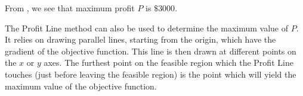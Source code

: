 \begin{subquestions}
From , we see that maximum profit $P$ is $ \$ 3000$.


\subquestion

The Profit Line method can also be used to determine the maximum value of $P$. It relies on drawing parallel lines, starting from the origin, which have the gradient of the objective function. This line is then drawn at different points on the $x$ or $y$ axes. The furthest point on the feasible region which the Profit Line touches (just before leaving the feasible region) is the point which will yield the maximum value of the objective function. 

\end{subquestions}

